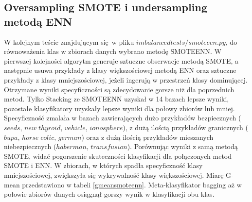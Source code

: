 \subsection{Oversampling SMOTE i undersampling metodą ENN}
W kolejnym teście znajdującym się w pliku $imbalancedtests/smoteeen.py$, do równoważenia klas w zbiorach danych wybrano metodę SMOTEENN. W pierwszej kolejności algorytm generuje sztuczne obserwacje metodą SMOTE, a następnie usuwa przykłady z klasy większościowej metodą ENN oraz sztuczne przykłady z klasy mniejszościowej, jeżeli ingerują w przestrzeń klasy dominującej. Otrzymane wyniki specyficzności są zdecydowanie gorsze niż dla poprzednich metod. Tylko Stacking ze SMOTEENN uzyskał w 14 bazach lepsze wyniki, pozostałe klasyfikatory uzyskały lepsze wyniki dla połowy zbiorów lub mniej. Specyficzność zmalała w bazach zawierających dużo przykładów bezpiecznych ($seeds$, $new\; thyroid$, $vehicle$, $ionosphere$), z dużą ilością przykładów granicznych ($bupa$, $horse\; colic$, $german$) oraz z dużą ilością przykładów mieszanych niebezpiecznych ($haberman$, $transfusion$). Porównując wyniki z samą metodą SMOTE, widać pogorszenie skuteczności klasyfikacji dla połączonych metod SMOTE i ENN.
W zbiorach, w których spadła specyficzność klasy mniejszościowej, zwiększyła się wykrywalność klasy większościowej. Miarę G-mean przedstawiono w tabeli \ref{gmeansmoteenn}. Meta-klasyfikator bagging aż w połowie zbiorów danych osiągnął gorszy wynik w klasyfikacji obu klas.
